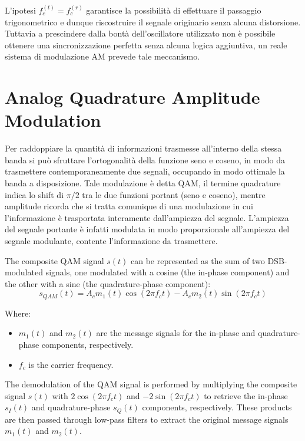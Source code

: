 L'ipotesi $f_c^{(t)} = f_c^{(r)}$ garantisce la possibilità di effettuare il passaggio trigonometrico e dunque riscostruire il segnale originario senza alcuna distorsione. Tuttavia a prescindere dalla bontà dell'oscillatore utilizzato non è possibile ottenere una sincronizzazione perfetta senza alcuna logica aggiuntiva, un reale sistema di modulazione AM prevede tale meccanismo.

\section*{Analog Quadrature Amplitude Modulation}

Per raddoppiare la quantità di informazioni trasmesse all'interno della stessa banda si può sfruttare l'ortogonalità della funzione seno e coseno, in modo da trasmettere contemporaneamente due segnali, occupando in modo ottimale la banda a disposizione. Tale modulazione è detta QAM, il termine quadrature indica lo shift di $\pi/2$ tra le due funzioni portant (seno e coseno), mentre amplitude ricorda che si tratta comunique di una modulazione in cui l'informazione è trasportata interamente dall'ampiezza del segnale. L'ampiezza del segnale portante è infatti modulata in modo proporzionale all'ampiezza del segnale modulante, contente l'informazione da trasmettere.





The composite QAM signal \( s(t) \) can be represented as the sum of two DSB-modulated signals, one modulated with a cosine (the in-phase component) and the other with a sine (the quadrature-phase component):
\begin{equation}
s_{QAM}(t) = A_{c} m_1(t) \cos(2\pi f_c t) - A_{c} m_2(t) \sin(2\pi f_c t)
\end{equation}

Where:
\begin{itemize}
    \item \( m_1(t) \) and \( m_2(t) \) are the message signals for the in-phase and quadrature-phase components, respectively.
    \item \( f_c \) is the carrier frequency.
\end{itemize}


The demodulation of the QAM signal is performed by multiplying the composite signal \( s(t) \) with \( 2\cos(2\pi f_c t) \) and \( -2\sin(2\pi f_c t) \) to retrieve the in-phase \( s_I(t) \) and quadrature-phase \( s_Q(t) \) components, respectively. These products are then passed through low-pass filters to extract the original message signals \( m_1(t) \) and \( m_2(t) \).

